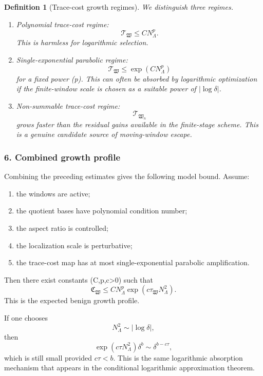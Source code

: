 \documentclass[11pt]{article}
\numberwithin{equation}{section}
\newtheorem{definition}[theorem]{Definition}
\begin{document}
\begin{definition}[Trace-cost growth regimes]
We distinguish three regimes.

\begin{enumerate}
\item \emph{Polynomial trace-cost regime:}
\[
\mathcal T_{\mathfrak W}\le C N_\Lambda^p.
\]
This is harmless for logarithmic selection.

\item \emph{Single-exponential parabolic regime:}
\[
\mathcal T_{\mathfrak W}\le \exp(CN_\Lambda^p)
\]
for a fixed power (p). This can often be absorbed by logarithmic optimization if the finite-window scale is chosen as a suitable power of \(|\log\delta|\).

\item \emph{Non-summable trace-cost regime:}
\[
\mathcal T_{\mathfrak W_n}
\]
grows faster than the residual gains available in the finite-stage scheme. This is a genuine candidate source of moving-window escape.
\end{enumerate}
\end{definition}

\subsubsection*{6. Combined growth profile}

Combining the preceding estimates gives the following model bound. Assume:

\begin{enumerate}
\item the windows are active;
\item the quotient bases have polynomial condition number;
\item the aspect ratio is controlled;
\item the localization scale is perturbative;
\item the trace-cost map has at most single-exponential parabolic amplification.
\end{enumerate}

Then there exist constants (C,p,c>0) such that
\[
\mathfrak C_{\mathfrak W}
\le
C N_\Lambda^p
\exp(c\tau_{\mathfrak W}N_\Lambda^2).
\]
This is the expected benign growth profile.

If one chooses
\[
N_\Lambda^2\sim |\log\delta|,
\]
then
\[
\exp(c\tau N_\Lambda^2)\delta^b
\sim
\delta^{b-c\tau},
\]
which is still small provided \(c\tau<b\). This is the same logarithmic absorption mechanism that appears in the conditional logarithmic approximation theorem.
\end{document}
